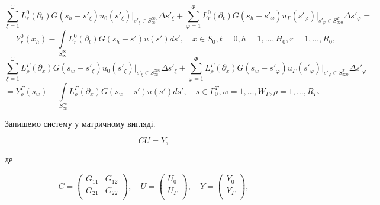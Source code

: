 \[
\sum_{\xi=1}^\Xi L_r^0(\partial_t)G(s_h-s'_\xi) u_0(s'_\xi)\bigg|_{s'_\xi\in S_{\infty}^{\infty 0}}\Delta s'_\xi +
\sum_{\varphi=1}^\Phi L_r^0(\partial_t)G(s_h-s'_\varphi) u_\Gamma(s'_\varphi)\bigg|_{s'_\varphi \in S_{\infty 0}^{T}}\Delta s'_\varphi =
\]
\[
=Y_r^0(x_h)-\int\limits_{S_\infty^\infty}L_r^0(\partial_t)G(s_h-s')u(s')ds',\quad x\in S_0, t=0, h=1,\ldots,H_0, r=1,\ldots,R_0,
\]
\[
\sum_{\xi=1}^\Xi L_\rho^\Gamma(\partial_x)G(s_w-s'_\xi) u_0(s'_\xi)\bigg|_{s'_\xi\in S_{\infty}^{\infty 0}}\Delta s'_\xi +
\sum_{\varphi=1}^\Phi L_\rho^\Gamma(\partial_x)G(s_w-s'_\varphi) u_\Gamma(s'_\varphi)\bigg|_{s'_\varphi \in S_{\infty 0}^{T}}\Delta s'_\varphi =
\]
\[
=Y_\rho^\Gamma(s_w)-\int\limits_{S_\infty^\infty}L_\rho^\Gamma(\partial_x)G(s_w-s')u(s')ds',\quad s\in \Gamma_0^T, w=1,\ldots,W_\Gamma, \rho=1,\ldots,R_\Gamma.
\]


Запишемо систему у матричному вигляді.

\begin{equation}
\label{eq:stoyan_sol_matrix_s_s_dash}
CU=Y,
\end{equation}

де

\[
C =
\left(
\begin{array}{cc}
G_{11} & G_{12} \\
G_{21} & G_{22} \\
\end{array}
\right),
\quad
U=
\left(
\begin{array}{c}
U_{0}  \\
U_{\Gamma} \\
\end{array}
\right),
\quad
Y=
\left(
\begin{array}{c}
Y_0 \\
Y_\Gamma \\
\end{array}
\right),
\]

